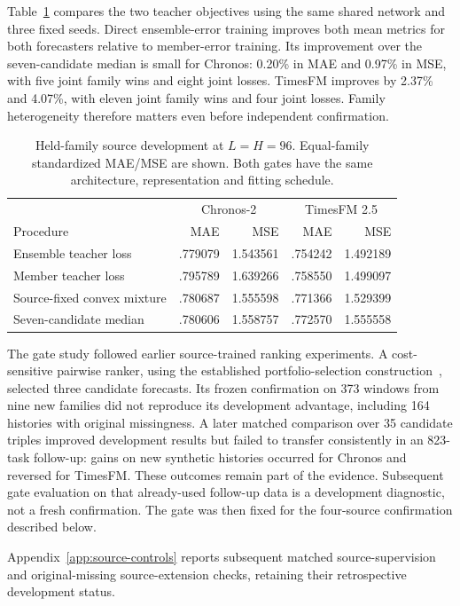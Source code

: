 \documentclass{article}
\begin{document}
Table~\ref{tab:r6_source} compares the two teacher objectives using the same shared network and three fixed seeds. Direct ensemble-error training improves both mean metrics for both forecasters relative to member-error training. Its improvement over the seven-candidate median is small for Chronos: 0.20\% in MAE and 0.97\% in MSE, with five joint family wins and eight joint losses. TimesFM improves by 2.37\% and 4.07\%, with eleven joint family wins and four joint losses. Family heterogeneity therefore matters even before independent confirmation.

\begin{table}[t]
\caption{Held-family source development at $L=H=96$. Equal-family standardized MAE/MSE are shown. Both gates have the same architecture, representation and fitting schedule.}
\label{tab:r6_source}
\centering\small
\begin{tabular}{lrrrr}
\toprule
 & \multicolumn{2}{c}{Chronos-2} & \multicolumn{2}{c}{TimesFM 2.5}\\
Procedure & MAE & MSE & MAE & MSE\\
\midrule
Ensemble teacher loss & .779079 & 1.543561 & .754242 & 1.492189\\
Member teacher loss & .795789 & 1.639266 & .758550 & 1.499097\\
Source-fixed convex mixture & .780687 & 1.555598 & .771366 & 1.529399\\
Seven-candidate median & .780606 & 1.558757 & .772570 & 1.555558\\
\bottomrule
\end{tabular}
\end{table}

The gate study followed earlier source-trained ranking experiments. A cost-sensitive pairwise ranker, using the established portfolio-selection construction~\citep{xu2012evaluating}, selected three candidate forecasts. Its frozen confirmation on 373 windows from nine new families did not reproduce its development advantage, including 164 histories with original missingness. A later matched comparison over 35 candidate triples improved development results but failed to transfer consistently in an 823-task follow-up: gains on new synthetic histories occurred for Chronos and reversed for TimesFM. These outcomes remain part of the evidence. Subsequent gate evaluation on that already-used follow-up data is a development diagnostic, not a fresh confirmation. The gate was then fixed for the four-source confirmation described below.

Appendix~\ref{app:source-controls} reports subsequent matched source-supervision and original-missing source-extension checks, retaining their retrospective development status.
\end{document}
